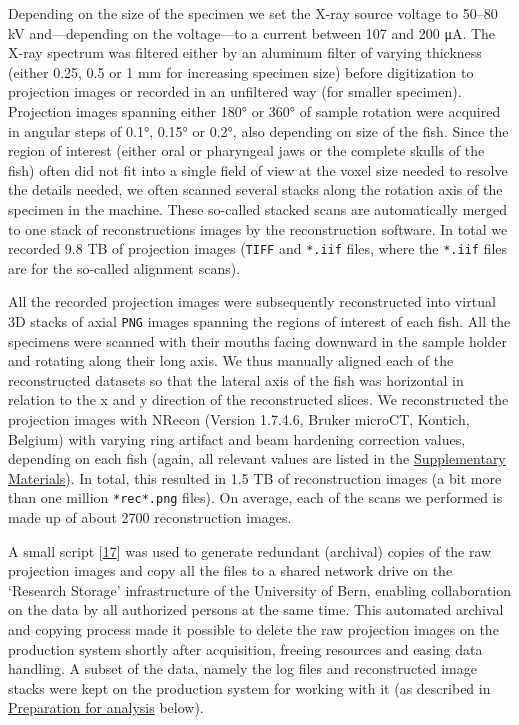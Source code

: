 Depending on the size of the specimen we set the X-ray source voltage to 50--80 kV and---depending on the voltage---to a current between 107 and 200 μA.
The X-ray spectrum was filtered either by an aluminum filter of varying thickness (either 0.25, 0.5 or 1 mm for increasing specimen size) before digitization to projection images or recorded in an unfiltered way (for smaller specimen).
Projection images spanning either 180° or 360° of sample rotation were acquired in angular steps of 0.1°, 0.15° or 0.2°, also depending on size of the fish.
Since the region of interest (either oral or pharyngeal jaws or the complete skulls of the fish) often did not fit into a single field of view at the voxel size needed to resolve the details needed, we often scanned several stacks along the rotation axis of the specimen in the machine.
These so-called stacked scans are automatically merged to one stack of reconstructions images by the reconstruction software.
In total we recorded 9.8 TB of projection images (\texttt{TIFF} and \texttt{*.iif} files, where the \texttt{*.iif} files are for the so-called alignment scans).

All the recorded projection images were subsequently reconstructed into virtual 3D stacks of axial \texttt{PNG} images spanning the regions of interest of each fish.
All the specimens were scanned with their mouths facing downward in the sample holder and rotating along their long axis.
We thus manually aligned each of the reconstructed datasets so that the lateral axis of the fish was horizontal in relation to the x and y direction of the reconstructed slices.
We reconstructed the projection images with NRecon (Version 1.7.4.6, Bruker microCT, Kontich, Belgium) with varying ring artifact and beam hardening correction values, depending on each fish (again, all relevant values are listed in the \protect\hyperlink{supplementary-materials}{Supplementary Materials}).
In total, this resulted in 1.5 TB of reconstruction images (a bit more than one million \texttt{*rec*.png} files).
On average, each of the scans we performed is made up of about 2700 reconstruction images.

A small script {[}\protect\hyperlink{ref-ZjgrPHTa}{17}{]} was used to generate redundant (archival) copies of the raw projection images and copy all the files to a shared network drive on the `Research Storage' infrastructure of the University of Bern, enabling collaboration on the data by all authorized persons at the same time.
This automated archival and copying process made it possible to delete the raw projection images on the production system shortly after acquisition, freeing resources and easing data handling.
A subset of the data, namely the log files and reconstructed image stacks were kept on the production system for working with it (as described in \protect\hyperlink{preparation-for-analysis}{Preparation for analysis} below).

